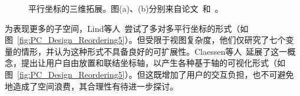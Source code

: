 \documentclass[12pt,twocolumn]{article}
\begin{document}
\begin{figure}[!htb]
\centering
{}
\caption{平行坐标的三维拓展。图(a)、(b)分别来自论文~\citep{johansson20053}和~\citep{fanea2005interactive}。}
\end{figure}

为表现更多的子空间，Lind等人~\citep{lind2009many}尝试了多对多平行坐标的形式（如图~\ref{fig:PC_Design_Reordering5}）。但受限于视图复杂度，他们仅研究了七个变量的情形，并认为这种形式不具备良好的可扩展性。Claessen等人~\citep{claessen2011flexible}延展了这一概念，提出让用户自由放置和联结坐标轴，以产生各种基于轴的可视化形式（如图~\ref{fig:PC_Design_Reordering5}）。但这既增加了用户的交互负担，也不可避免地造成了空间浪费，其合理性有待进一步探讨。
\end{document}
